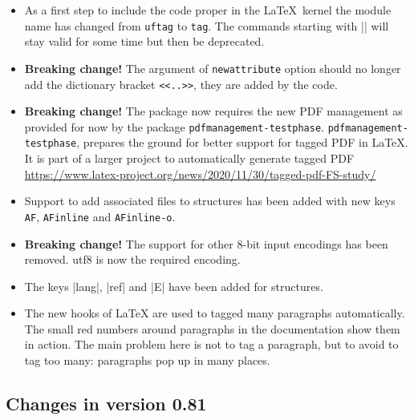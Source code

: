 \documentclass[DIV=12,parskip=half-,bibliography=totoc]{scrartcl}
\begin{document}
\begin{itemize}
\item  As a first step to include the code proper in the \LaTeX\ kernel the module name has changed from \texttt{uftag} to \texttt{tag}. The commands starting with |\uftag| will stay valid for some time but then be deprecated.

\item \textbf{Breaking change!} The argument of \texttt{newattribute} option should no longer add the dictionary bracket \verb+<<..>>+, they are added by the code.


\item \textbf{Breaking change!} The package now requires the new PDF management as provided for now by the package \texttt{pdfmanagement-testphase}. \texttt{pdfmanagement-testphase},
prepares the ground for better support for tagged PDF in \LaTeX{}.
It is part of a larger project to automatically generate tagged PDF \url{https://www.latex-project.org/news/2020/11/30/tagged-pdf-FS-study/}

\item Support to add associated files to structures has been added with new keys \texttt{AF}, \texttt{AFinline} and \texttt{AFinline-o}.

\item \textbf{Breaking change!} The support for other 8-bit input encodings has been removed.
utf8 is now the required encoding.

\item The keys |lang|, |ref| and |E| have been added for structures.

\item The new hooks of LaTeX are used to tagged many paragraphs automatically. The small red numbers around paragraphs in the documentation show them in action. The main problem here is not to tag a paragraph, but to avoid to tag too many: paragraphs pop up in many places.
\end{itemize}

\subsection{Changes in version 0.81}
\end{document}
